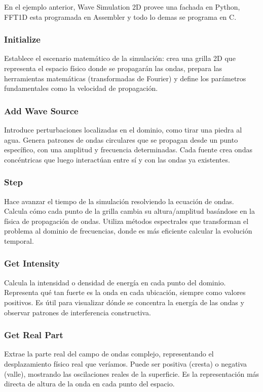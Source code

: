 \documentclass[a4paper]{article}
\begin{document}
En el ejemplo anterior, Wave Simulation 2D provee una fachada en Python, FFT1D esta programada en Assembler y todo lo demas se programa en C.

\subsubsection{Initialize} Establece el escenario matemático de la simulación: crea una grilla 2D que representa el espacio físico donde se propagarán las ondas, prepara las herramientas matemáticas (transformadas de Fourier) y define los parámetros fundamentales como la velocidad de propagación.

\subsubsection{Add Wave Source} Introduce perturbaciones localizadas en el dominio, como tirar una piedra al agua. Genera patrones de ondas circulares que se propagan desde un punto específico, con una amplitud y frecuencia determinadas. Cada fuente crea ondas concéntricas que luego interactúan entre sí y con las ondas ya existentes.

\subsubsection{Step} Hace avanzar el tiempo de la simulación resolviendo la ecuación de ondas. Calcula cómo cada punto de la grilla cambia su altura/amplitud basándose en la física de propagación de ondas. Utiliza métodos espectrales que transforman el problema al dominio de frecuencias, donde es más eficiente calcular la evolución temporal.

\subsubsection{Get Intensity} Calcula la intensidad o densidad de energía en cada punto del dominio. Representa qué tan fuerte es la onda en cada ubicación, siempre como valores positivos. Es útil para visualizar dónde se concentra la energía de las ondas y observar patrones de interferencia constructiva.

\subsubsection{Get Real Part} Extrae la parte real del campo de ondas complejo, representando el desplazamiento físico real que veríamos. Puede ser positiva (cresta) o negativa (valle), mostrando las oscilaciones reales de la superficie. Es la representación más directa de altura de la onda en cada punto del espacio.
\end{document}
